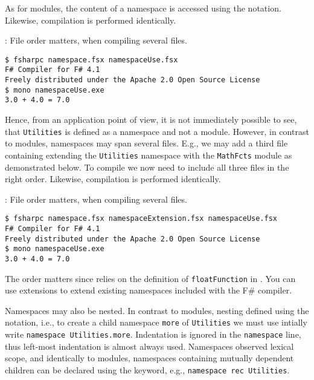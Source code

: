 As for modules, the content of a namespace is accessed using the  notation.
%
%
Likewise, compilation is performed identically.
\begin{codeNOutput}{: File order matters, when compiling several files.}
\begin{lstlisting}[language=console,escapechar=§]
$ fsharpc namespace.fsx namespaceUse.fsx                                           
F# Compiler for F# 4.1
Freely distributed under the Apache 2.0 Open Source License
$ mono namespaceUse.exe 
3.0 + 4.0 = 7.0
\end{lstlisting}
\end{codeNOutput}
Hence, from an application point of view, it is not immediately possible to see, that \lstinline{Utilities} is defined as a namespace and not a module.  However, in contrast to modules, namespaces may span several files. E.g., we may add a third file containing extending the \lstinline{Utilities} namespace with the \lstinline{MathFcts} module as demonstrated below.
%
%
To compile we now need to include all three files in the right order.
%
Likewise, compilation is performed identically.
\begin{codeNOutput}{: File order matters, when compiling several files.}
\begin{lstlisting}[language=console,escapechar=§]
$ fsharpc namespace.fsx namespaceExtension.fsx namespaceUse.fsx                                           
F# Compiler for F# 4.1
Freely distributed under the Apache 2.0 Open Source License
$ mono namespaceUse.exe 
3.0 + 4.0 = 7.0
\end{lstlisting}
\end{codeNOutput}
The order matters since  relies on the definition of \lstinline{floatFunction} in . You can use extensions to extend existing namespaces included with the F\# compiler.

Namespaces may also be nested. In contrast to modules, nesting defined using the  notation, i.e., to create a child namespace \lstinline{more} of \lstinline{Utilities} we must use intially write \lstinline{namespace Utilities.more}. Indentation is ignored in the \lstinline{namespace} line, thus left-most indentation is almost always used. Namespaces observed lexical scope, and identically to modules, namespaces containing mutually dependent children can be declared using the  keyword, e.g., \lstinline{namespace rec Utilities}.

